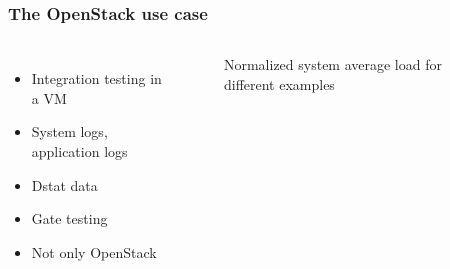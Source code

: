 \documentclass[aspectratio=169,11pt,hyperref={colorlinks=true}]{beamer}
\begin{document}
\begin{frame}
    \frametitle{The OpenStack use case}
    \begin{columns}
        \begin{itemize}
            \item{Integration testing in a VM}
            \item{System logs, application logs}
            \item{Dstat data}
            \item{Gate testing}
            \item{Not only OpenStack}
        \end{itemize}
        \begin{figure}
        \begin{center}
            \caption{Normalized system average load for different examples}
        \end{center}
        \end{figure}
    \end{columns}
\end{frame}
\end{document}
